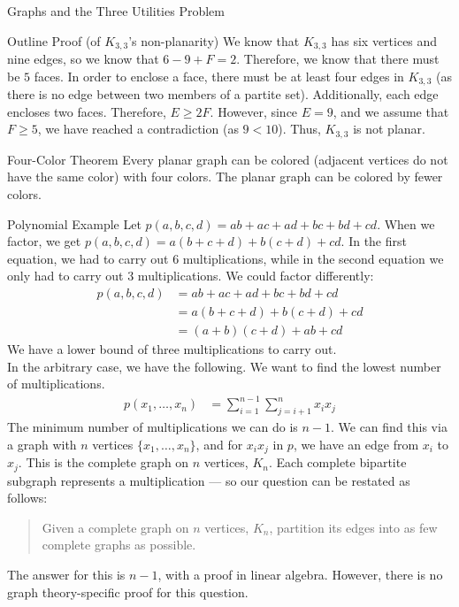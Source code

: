 \documentclass[10pt]{extarticle}
\begin{document}
\begin{problem}{Graphs and the Three Utilities Problem}
\begin{problem}{Outline Proof (of $K_{3,3}$'s non-planarity)}
      We know that $K_{3,3}$ has six vertices and nine edges, so we know that $6-9+F = 2$. Therefore, we know that there must be $5$ faces. In order to enclose a face, there must be at least four edges in $K_{3,3}$ (as there is no edge between two members of a partite set). Additionally, each edge encloses two faces. Therefore, $E\geq 2F$. However, since $E = 9$, and we assume that $F\geq 5$, we have reached a contradiction (as $9<10$). Thus, $K_{3,3}$ is not planar.
    \end{problem}
    \begin{problem}{Four-Color Theorem}
      Every planar graph can be colored (adjacent vertices do not have the same color) with four colors. The planar graph can be colored by fewer colors.
    \end{problem}
    \begin{problem}{Polynomial Example}
      Let $p(a,b,c,d) = ab + ac + ad + bc +bd + cd$. When we factor, we get $p(a,b,c,d) = a(b+c+d) + b(c+d) + cd$. In the first equation, we had to carry out 6 multiplications, while in the second equation we only had to carry out 3 multiplications. We could factor differently:
      \begin{align*}
        p(a,b,c,d) &= ab + ac + ad + bc + bd + cd \\
                   &= a(b+c+d) + b(c+d) + cd\\
                   &= (a+b)(c+d) + ab + cd
      \end{align*}
      We have a lower bound of three multiplications to carry out.\\

      In the arbitrary case, we have the following. We want to find the lowest number of multiplications.
      \begin{align*}
        p(x_1,\dots,x_n) &= \sum_{i = 1}^{n-1}\sum_{j = i+1}^{n} x_ix_j
      \end{align*}
      \tcblower
      The minimum number of multiplications we can do is $n-1$. We can find this via a graph with $n$ vertices $\{x_1,\dots,x_n\}$, and for $x_ix_j$ in $p$, we have an edge from $x_i$ to $x_j$. This is the complete graph on $n$ vertices, $K_n$. Each complete bipartite subgraph represents a multiplication — so our question can be restated as follows:
      \begin{quote}
          Given a complete graph on $n$ vertices, $K_n$, partition its edges into as few complete graphs as possible.
      \end{quote}
      The answer for this is $n-1$, with a proof in linear algebra. However, there is no graph theory-specific proof for this question.
    \end{problem}
  \end{problem}
\end{document}
